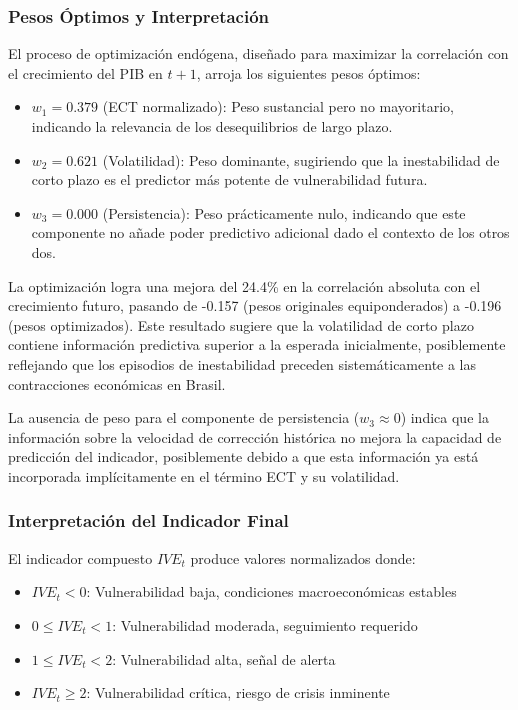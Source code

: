 \documentclass[3p,11pt]{elsarticle}
\begin{document}
\subsubsection{Pesos Óptimos y Interpretación}

El proceso de optimización endógena, diseñado para maximizar la correlación con el crecimiento del PIB en $t+1$, arroja los siguientes pesos óptimos:

\begin{itemize}
    \item $w_1 = 0.379$ (ECT normalizado): Peso sustancial pero no mayoritario, indicando la relevancia de los desequilibrios de largo plazo.
    \item $w_2 = 0.621$ (Volatilidad): Peso dominante, sugiriendo que la inestabilidad de corto plazo es el predictor más potente de vulnerabilidad futura.
    \item $w_3 = 0.000$ (Persistencia): Peso prácticamente nulo, indicando que este componente no añade poder predictivo adicional dado el contexto de los otros dos.
\end{itemize}

La optimización logra una mejora del 24.4\% en la correlación absoluta con el crecimiento futuro, pasando de -0.157 (pesos originales equiponderados) a -0.196 (pesos optimizados). Este resultado sugiere que la volatilidad de corto plazo contiene información predictiva superior a la esperada inicialmente, posiblemente reflejando que los episodios de inestabilidad preceden sistemáticamente a las contracciones económicas en Brasil.

La ausencia de peso para el componente de persistencia ($w_3 \approx 0$) indica que la información sobre la velocidad de corrección histórica no mejora la capacidad de predicción del indicador, posiblemente debido a que esta información ya está incorporada implícitamente en el término ECT y su volatilidad.

\subsubsection{Interpretación del Indicador Final}

El indicador compuesto $IVE_t$ produce valores normalizados donde:

\begin{itemize}
    \item \textbf{$IVE_t < 0$}: Vulnerabilidad baja, condiciones macroeconómicas estables
    \item \textbf{$0 \leq IVE_t < 1$}: Vulnerabilidad moderada, seguimiento requerido
    \item \textbf{$1 \leq IVE_t < 2$}: Vulnerabilidad alta, señal de alerta
    \item \textbf{$IVE_t \geq 2$}: Vulnerabilidad crítica, riesgo de crisis inminente
\end{itemize}
\end{document}
